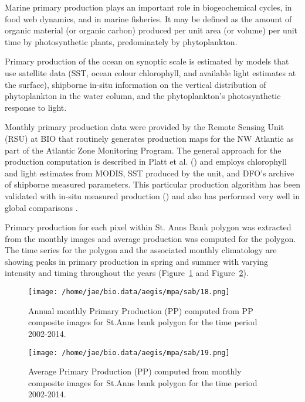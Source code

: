 \documentclass[letterpaper,portrait,11pt]{scrartcl}
\numberwithin{equation}{section}    %
\numberwithin{figure}{section}    %
\numberwithin{table}{section}       %
\begin{document}
Marine primary production plays an important role in biogeochemical cycles, in food web dynamics, and in marine fisheries. It may be defined as the amount of organic material (or organic carbon) produced per unit area (or volume) per unit time by photosynthetic plants, predominately by phytoplankton.

Primary production of the ocean on synoptic scale is estimated by models that use satellite data (SST, ocean colour chlorophyll, and available light estimates at the surface), shipborne in-situ information on the vertical distribution of phytoplankton in the water column, and the phytoplankton\textquoteright s photosynthetic response to light.

Monthly primary production data were provided by the Remote Sensing Unit (RSU) at BIO that routinely generates production maps for the NW Atlantic as part of the Atlantic Zone Monitoring Program. The general approach for the production computation is described in Platt et al. (\cite{platt2008}) and employs chlorophyll and light estimates from MODIS, SST produced by the unit, and DFO's archive of shipborne measured parameters. This particular production algorithm has been validated with in-situ measured production (\cite{platt1988}) and also has performed very well in global comparisons \parencite{carr2006comparison}.

Primary production for each pixel within St. Anns Bank polygon was extracted from the monthly images and average production was computed for the polygon. The time series for the polygon and the associated monthly climatology are showing peaks in primary production in spring and summer with varying intensity and timing throughout the years (Figure~\ref{fig:ppTSmonthly} and Figure~\ref{fig:ppTSannual}).


\begin{figure}[h]
  \centering
  \texttt{[image: /home/jae/bio.data/aegis/mpa/sab/18.png]}
  \caption{Annual monthly Primary Production (PP) computed from PP composite images for St.Anns bank polygon for the time period 2002-2014.}
  \label{fig:ppTSmonthly}
\end{figure}


\begin{figure}[h]
  \centering
  \texttt{[image: /home/jae/bio.data/aegis/mpa/sab/19.png]}
  \caption{Average Primary Production (PP) computed from monthly composite images for St.Anns bank polygon for the time period 2002-2014.}
  \label{fig:ppTSannual}
\end{figure}
\end{document}
